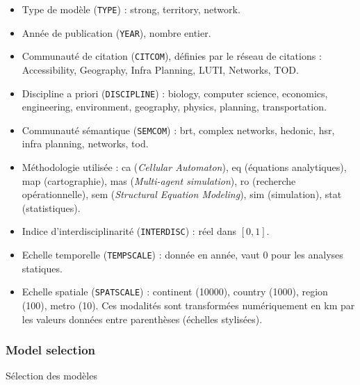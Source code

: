\begin{itemize}
	\item Type de modèle (\texttt{TYPE}) : strong, territory, network.
	\item Année de publication (\texttt{YEAR}), nombre entier.
	\item Communauté de citation (\texttt{CITCOM}), définies par le réseau de citations : Accessibility, Geography, Infra Planning, LUTI, Networks, TOD.
	\item Discipline a priori (\texttt{DISCIPLINE}) : biology, computer science, economics, engineering, environment, geography, physics, planning, transportation.
	\item Communauté sémantique (\texttt{SEMCOM}) : brt, complex networks, hedonic, hsr, infra planning, networks, tod.
	\item Méthodologie utilisée : ca (\emph{Cellular Automaton}), eq (équations analytiques), map (cartographie), mas (\emph{Multi-agent simulation}), ro (recherche opérationnelle), sem (\emph{Structural Equation Modeling}), sim (simulation), stat (statistiques).
	\item Indice d'interdisciplinarité (\texttt{INTERDISC}) : réel dans $[0,1]$.
	\item Echelle temporelle (\texttt{TEMPSCALE}) : donnée en année, vaut 0 pour les analyses statiques.
	\item Echelle spatiale (\texttt{SPATSCALE}) : continent (10000), country (1000), region (100), metro (10). Ces modalités sont transformées numériquement en km par les valeurs données entre parenthèses (échelles stylisées).
\end{itemize}




\subsubsection{Model selection}{Sélection des modèles}

